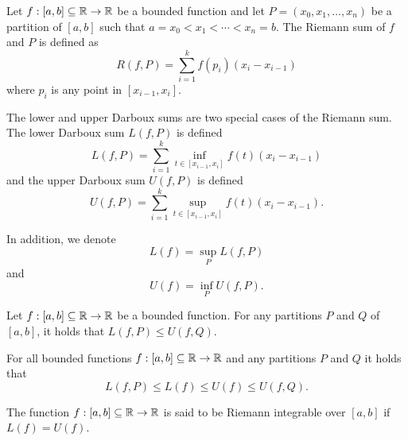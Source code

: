 \documentclass{article}
\begin{document}
\begin{definition}
    Let ${f: [a, b] \subseteq \mathbb{R} \rightarrow \mathbb{R}}$ be a bounded function
    and let ${P = (x_0, x_1, \ldots, x_n)}$ be a partition of $[a, b]$ such that
    ${a = x_0 < x_1 < \cdots < x_n = b}$. The Riemann sum of $f$ and $P$ is defined
    as
    \begin{equation*}
        R(f, P) = \sum_{i=1}^k f(p_i)(x_i - x_{i-1})
    \end{equation*}
    where $p_i$ is any point in $[x_{i-1}, x_i]$.

    The lower and upper Darboux sums are two special cases of the Riemann sum.
    The lower Darboux sum $L(f, P)$ is defined
    \begin{equation*}
        L(f, P) = \sum_{i=1}^k \inf_{t \in [x_{i-1}, x_i]} f(t)(x_i - x_{i-1})
    \end{equation*}
    and the upper Darboux sum $U(f, P)$ is defined
    \begin{equation*}
        U(f, P) = \sum_{i=1}^k \sup_{t \in [x_{i-1}, x_i]} f(t)(x_i - x_{i-1}).
    \end{equation*}

    In addition, we denote
    \begin{equation*}
        L(f) = \sup_{P} L(f, P)
    \end{equation*}
    and
    \begin{equation*}
        U(f) = \inf_{P} U(f, P).
    \end{equation*}
\end{definition}

\begin{theorem}
    Let ${f: [a, b] \subseteq \mathbb{R} \rightarrow \mathbb{R}}$ be a bounded function.
    For any partitions $P$ and $Q$ of $[a, b]$, it holds that
    $L(f, P) \leq U(f, Q)$.
\end{theorem}

\begin{corollary}
    For all bounded functions ${f: [a, b] \subseteq \mathbb{R} \rightarrow \mathbb{R}}$
    and any partitions $P$ and $Q$ it holds that
    \begin{equation*}
        L(f, P) \leq L(f) \leq U(f) \leq U(f, Q).
    \end{equation*}
\end{corollary}

\begin{definition}
    The function ${f: [a, b] \subseteq \mathbb{R} \rightarrow \mathbb{R}}$ is said to be
    Riemann integrable over $[a, b]$ if $L(f) = U(f)$.
\end{definition}
\end{document}

